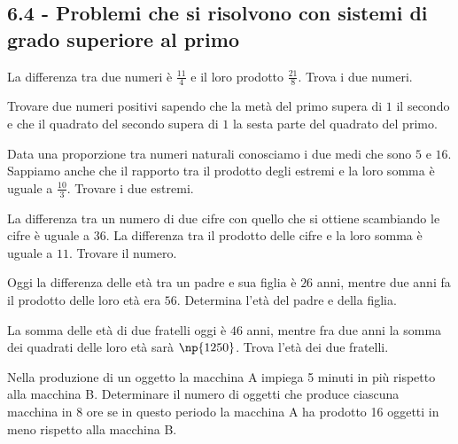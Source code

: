 \subsection*{6.4 - Problemi che si risolvono con sistemi di grado superiore al primo}
\begin{multicols}{2}
\begin{esercizio}[\Ast]
 \label{ese:6.49}
La differenza tra due numeri è $\frac {11} 4$ e il loro prodotto $\frac {21} 8$. Trova i due numeri.
\end{esercizio}

\begin{esercizio}[\Ast]
 \label{ese:6.50}
Trovare due numeri positivi sapendo che la metà del primo supera di $ 1 $ il secondo e che il quadrato del secondo supera di $ 1 $ la sesta parte del quadrato del primo.
\end{esercizio}

\begin{esercizio}[\Ast]
 \label{ese:6.51}
Data una proporzione tra numeri naturali conosciamo i due medi che sono $ 5 $ e $ 16 $. Sappiamo anche che il rapporto tra il prodotto degli estremi e la loro somma è uguale a $\frac {10} 3 $. Trovare i due estremi.
\end{esercizio}

\begin{esercizio}[\Ast]
 \label{ese:6.52}
La differenza tra un numero di due cifre con quello che si ottiene scambiando le cifre è uguale a $ 36 $. La differenza tra il prodotto delle cifre e la loro somma è uguale a $ 11 $. Trovare il numero.
\end{esercizio}

\begin{esercizio}[\Ast]
 \label{ese:6.53}
Oggi la differenza delle età tra un padre e sua figlia è $ 26 $ anni, mentre due anni fa il prodotto delle loro età era $ 56 $. Determina l'età del padre e della figlia.
\end{esercizio}

\begin{esercizio}[\Ast]
 \label{ese:6.54}
La somma delle età di due fratelli oggi è $46$ anni, mentre fra due anni la somma dei quadrati delle loro età sarà $\np{1250}$. Trova l'età dei due fratelli.
\end{esercizio}

\begin{esercizio}[\Ast]
 \label{ese:6.55}
Nella produzione di un oggetto la macchina A impiega 5 minuti in più rispetto alla macchina B. Determinare il numero di oggetti che produce ciascuna macchina in 8 ore se in questo periodo la macchina A ha prodotto 16 oggetti in meno rispetto alla macchina B.
\end{esercizio}


\end{multicols}
